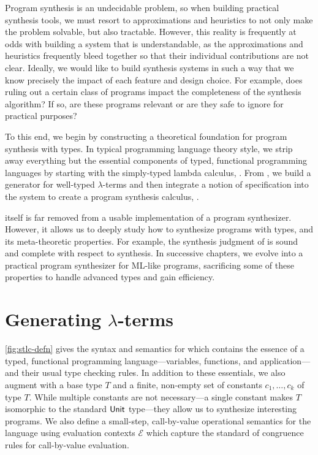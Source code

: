 Program synthesis is an undecidable problem, so when building practical synthesis tools, we must resort to approximations and heuristics to not only make the problem solvable, but also tractable.
However, this reality is frequently at odds with building a system that is understandable, as the approximations and heuristics frequently bleed together so that their individual contributions are not clear.
Ideally, we would like to build synthesis systems in such a way that we know precisely the impact of each feature and design choice.
For example, does ruling out a certain class of programs impact the completeness of the synthesis algorithm?
If so, are these programs relevant or are they safe to ignore for practical purposes?

To this end, we begin by constructing a theoretical foundation for program synthesis with types.
In typical programming language theory style, we strip away everything but the essential components of typed, functional programming languages by starting with the simply-typed lambda calculus, \stlc{}.
From \stlc{}, we build a generator for well-typed $λ$-terms and then integrate a notion of specification into the system to create a program synthesis calculus, \lsyn{}.

\lsyn{} itself is far removed from a usable implementation of a program synthesizer.
However, it allows us to deeply study how to synthesize programs with types, and its meta-theoretic properties.
For example, the synthesis judgment of \lsyn{} is sound and complete with respect to synthesis.
In successive chapters, we evolve \lsyn{} into a practical program synthesizer for ML-like programs, sacrificing some of these properties to handle advanced types and gain efficiency.

\section{Generating \texorpdfstring{$λ$}{λ}-terms}
\label{sec:generating-lambda-terms}



\autoref{fig:stlc-defn} gives the syntax and semantics for \stlc{} which contains the essence of a typed, functional programming language---variables, functions, and application---and their usual type checking rules.
In addition to these essentials, we also augment \stlc{} with a base type $T$ and a finite, non-empty set of constants $c_1, …, c_k$ of type $T$.
While multiple constants are not necessary---a single constant makes $T$ isomorphic to the standard $\mathsf{Unit}$ type---they allow us to synthesize interesting programs.
We also define a small-step, call-by-value operational semantics for the language using evaluation contexts $ℰ$ which capture the standard of congruence rules for call-by-value evaluation.

